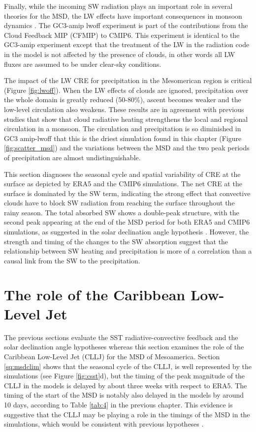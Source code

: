 Finally, while the incoming SW radiation plays an important role in several theories for the MSD, the LW effects have important consequences in monsoon dynamics \citep{guo2015,byrne2020}. 
The GC3-amip lwoff experiment is part of the contributions from the Cloud Feedback MIP (CFMIP)  \citep{webb2017} to CMIP6. This experiment is identical to the GC3-amip experiment except that the treatment of the LW in the radiation code in the model is not affected by the presence of clouds, in other words all LW fluxes are assumed to be under clear-sky conditions. 

The impact of the LW CRE for precipitation in the Mesomerican region is critical (Figure \ref{fig:lwoff}). When the LW effects of clouds are ignored, precipitation over the whole domain is greatly reduced (50-80\%), ascent becomes weaker and the low-level circulation also weakens. 
These results are in agreement with previous studies \citep{guo2015,byrne2020} that show that cloud radiative heating strengthens the local and regional circulation in a monsoon. The circulation and precipitation is so diminished in GC3 amip-lwoff that this is the driest simulation found in this chapter (Figure \ref{fig:scatter_msd}) and the variations between the MSD and the two peak periods of precipitation are almost undistinguishable. 

This section diagnoses the seasonal cycle and spatial variability of CRE at the surface as depicted by ERA5 and the CMIP6 simulations. The net CRE at the surface is dominated by the SW term, indicating the strong effect that convective clouds have to block SW radiation from reaching the surface throughout the rainy season. The total absorbed SW shows a double-peak structure, with the second peak appearing at the end of the MSD period for both ERA5 and CMIP6 simulations, as suggested in the solar declination angle hypothesis \cite{karnauskas2013}. However, the strength and timing of the changes to the SW absorption suggest that the relationship between SW heating and precipitation is more of a correlation than a causal link from the SW to the precipitation. 

\section{The role of the Caribbean Low-Level Jet}

The previous sections evaluate the SST radiative-convective feedback and the solar declination angle hypotheses whereas this section examines the role of the Caribbean Low-Level Jet (CLLJ) for the MSD of Mesoamerica. Section \ref{sq:msdclim} shows that the seasonal cycle of the CLLJ, is well represented by the simulations (see Figure \ref{fig:csst}d), but the timing of the peak magnitude of the CLLJ in the models is delayed by about three weeks with respect to ERA5. The timing of the start of the MSD is notably also delayed in the models by around 10 days, according to Table \ref{tab:4} in the previous chapter. This evidence is suggestive that the CLLJ may be playing a role in the timings of the MSD in the simulations, which would be consistent with previous hypotheses \citep[e.g.][]{herrera2015,martinez2019}.

